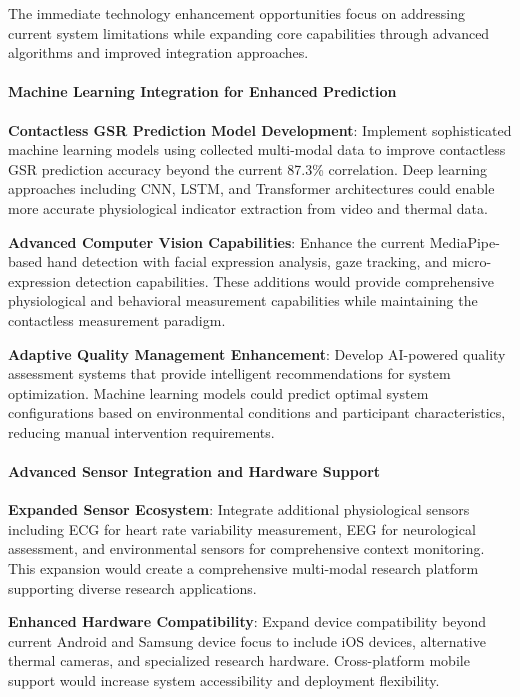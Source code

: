 \documentclass[11pt,a4paper]{article}
\begin{document}
The immediate technology enhancement opportunities focus on addressing current system limitations while expanding core
capabilities through advanced algorithms and improved integration approaches.

\paragraph{Machine Learning Integration for Enhanced Prediction}

\textbf{Contactless GSR Prediction Model Development}: Implement sophisticated machine learning models using collected
multi-modal data to improve contactless GSR prediction accuracy beyond the current 87.3\% correlation. Deep learning
approaches including CNN, LSTM, and Transformer architectures could enable more accurate physiological indicator
extraction from video and thermal data.

\textbf{Advanced Computer Vision Capabilities}: Enhance the current MediaPipe-based hand detection with facial expression
analysis, gaze tracking, and micro-expression detection capabilities. These additions would provide comprehensive
physiological and behavioral measurement capabilities while maintaining the contactless measurement paradigm.

\textbf{Adaptive Quality Management Enhancement}: Develop AI-powered quality assessment systems that provide intelligent
recommendations for system optimization. Machine learning models could predict optimal system configurations based on
environmental conditions and participant characteristics, reducing manual intervention requirements.

\paragraph{Advanced Sensor Integration and Hardware Support}

\textbf{Expanded Sensor Ecosystem}: Integrate additional physiological sensors including ECG for heart rate variability
measurement, EEG for neurological assessment, and environmental sensors for comprehensive context monitoring. This
expansion would create a comprehensive multi-modal research platform supporting diverse research applications.

\textbf{Enhanced Hardware Compatibility}: Expand device compatibility beyond current Android and Samsung device focus to
include iOS devices, alternative thermal cameras, and specialized research hardware. Cross-platform mobile support would
increase system accessibility and deployment flexibility.
\end{document}
